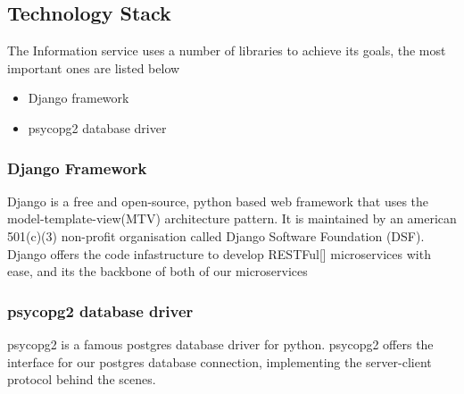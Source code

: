 		\subsection{Technology Stack}
			The Information service uses a number of libraries to achieve its goals, the most important ones are listed below
			\begin{itemize}
				\item Django framework
				\item psycopg2 database driver
			\end{itemize}	
			\subsubsection{Django Framework}
				\label{django}
				Django is a free and open-source, python based web framework that uses the model-template-view(MTV) architecture pattern. 
				It is maintained by an american  501(c)(3) non-profit organisation called Django Software Foundation (DSF). Django offers 
				the code infastructure to develop RESTFul[\cite{restful-rfc7231}] microservices with ease, and its the backbone of both of our
				microservices
			\subsubsection{psycopg2 database driver}
				\label{psycopg2}
				psycopg2 is a famous postgres database driver for python. psycopg2 offers the interface for our postgres database connection, 
				implementing the server-client protocol behind the scenes.
